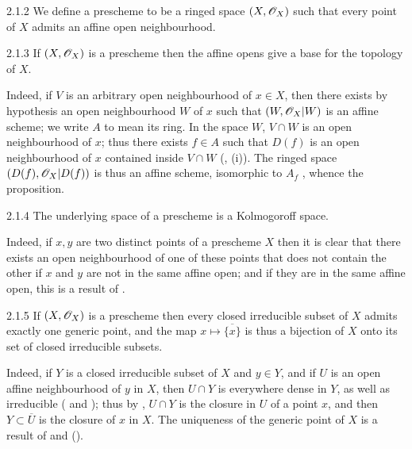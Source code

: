 \begin{envs}[Definition]{2.1.2}
\label{defn-1.2.1.2}
We define a prescheme to be a ringed space
$(X,\mathscr{O}_X)$ such that every point of $X$ admits an affine open neighbourhood.
\end{envs}

\begin{envs}[Proposition]{2.1.3}
\label{prop-1.2.1.3}
If $(X,\mathscr{O}_X)$ is a prescheme then the affine opens give a base for the topology of $X$.
\end{envs}

Indeed, if $V$ is an arbitrary open neighbourhood of $x\in X$, then there
exists by hypothesis an open neighbourhood $W$ of $x$ such that $(W,\mathscr{O}_X|W)$ is
an affine scheme; we write $A$ to mean its ring. In the space $W$, $V\cap W$ is
an open neighbourhood of $x$; thus there exists $f\in A$ such that $D(f)$ is an
open neighbourhood of $x$ contained inside $V\cap W$ (, (i)). The ringed
space $(D(f),\mathscr{O}_X|D(f))$ is thus an affine scheme, isomorphic to $A_f$
, whence the proposition.

\begin{envs}[Proposition]{2.1.4}
\label{prop-1.2.1.4}
The underlying space of a prescheme is a Kolmogoroff space.
\end{envs}

Indeed, if $x,y$ are two distinct points of a prescheme $X$ then it is clear
that there exists an open neighbourhood of one of these points that does not
contain the other if $x$ and $y$ are not in the same affine open; and if they
are in the same affine open, this is a result of .

\begin{envs}[Proposition]{2.1.5}
\label{prop-1.2.1.5}
If $(X,\mathscr{O}_X)$ is a prescheme then every closed
irreducible subset of $X$ admits exactly one generic point, and the map
$x\mapsto\overline{\{x\}}$ is thus a bijection of $X$ onto its set of closed
irreducible subsets.
\end{envs}

Indeed, if $Y$ is a closed irreducible subset of $X$ and $y\in Y$, and if $U$
is an open affine neighbourhood of $y$ in $X$, then $U\cap Y$ is everywhere
dense in $Y$, as well as irreducible ( and ); thus by
, $U\cap Y$ is the closure in $U$ of a point $x$, and then
$Y\subset\overline{U}$ is the closure of $x$ in $X$. The uniqueness of the
generic point of $X$ is a result of  and ().

